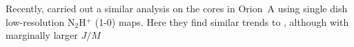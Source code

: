 Recently, \cite{Tatematsu_2016} carried out a similar analysis on the cores in Orion~A using single dish low-resolution N$_2$H$^+$ (1-0) maps. Here they find similar trends to \cite{Goodman_1993}, although with marginally larger $J/M$